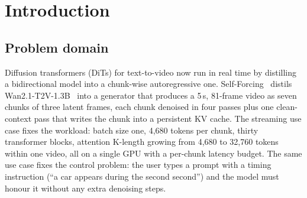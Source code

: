 \documentclass[10pt,a4paper]{article}
\begin{document}
\begin{abstract}
\textbf{Part B (timing control)} asks whether TempoControl's gradient-based control of an object's appearance time, which costs about $2.6\times$ sampling time and about 110\,GB of memory, can be replaced by a forward-only edit. A per-frame logit bias on the object's text tokens in cross-attention ($+\beta$ on frames where the object should be visible, $-\gamma$ elsewhere, $\beta=\gamma=2$) raises TempoControl's official temporal-accuracy metric on Wan2.1 from 0.695 to 0.850 on all 80 single-object prompts (+15.5 points, 95\% CI [+11.1, +20.2]) against TempoControl's reported +19.7 (gains are compared, not absolute accuracies: our baseline scores 69.5\% to their 63.9\%, outside the pre-registered $\pm5$ band), on all 82 two-object pairs from 37.6\% to 47.2\% (+9.6, with a baseline that matches TempoControl's 37.5\%, so absolute accuracies are comparable there), and inside the real-time streaming model, where gradient-based control cannot run within the per-chunk latency budget or the memory of this GPU, from 0.617 to 0.875 (+25.8; replicated +24.2 at a second seed). It costs +0.8\% time over an fp32 explicit attention path (itself +6.5\%) and +1.58\% when carried inside Wan's own FlashAttention-2 kernel through eight padding head dimensions, with no extra memory, on a 40\,GB GPU. The method is essentially TS-Attn specialised to one object; the contribution is the measurement, including a pre-registered miss (VBench imaging quality $-0.043$) and a blinded substitute-object count that erases part of the gain against prompt switching.
\end{abstract}

\section{Introduction}

\subsection{Problem domain}
Diffusion transformers (DiTs) for text-to-video now run in real time by distilling a bidirectional model into a chunk-wise autoregressive one. Self-Forcing~\cite{selfforcing} distils Wan2.1-T2V-1.3B~\cite{wan} into a generator that produces a 5\,s, 81-frame video as seven chunks of three latent frames, each chunk denoised in four passes plus one clean-context pass that writes the chunk into a persistent KV cache. The streaming use case fixes the workload: batch size one, 4{,}680 tokens per chunk, thirty transformer blocks, attention K-length growing from 4{,}680 to 32{,}760 tokens within one video, all on a single GPU with a per-chunk latency budget. The same use case fixes the control problem: the user types a prompt with a timing instruction (``a car appears during the second second'') and the model must honour it without any extra denoising steps.
\end{document}

